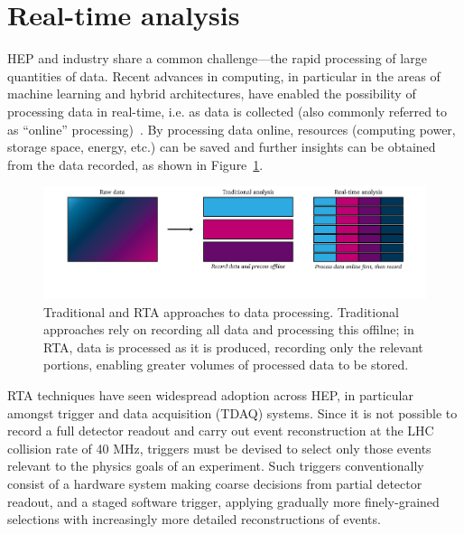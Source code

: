 \section{Real-time analysis}
\label{rta}
HEP and industry share a common challenge—the rapid processing of large quantities of data. \cite{hu-big-data} Recent advances in computing, in particular in the areas of machine learning and hybrid architectures, have enabled the possibility of processing data in real-time, i.e. as data is collected (also commonly referred to as ``online'' processing)~\cite{real-time-computing}. By processing data online, resources (computing power, storage space, energy, etc.) can be saved and further insights can be obtained from the data recorded, as shown in Figure~\ref{rta-diagram}. \par

\begin{figure}[h!]
    \centering
    \includegraphics[width=\linewidth]{figures/rta-diagram.pdf}
    \caption{Traditional and RTA approaches to data processing. Traditional approaches rely on recording all data and processing this offilne; in RTA, data is processed as it is produced, recording only the relevant portions, enabling greater volumes of processed data to be stored.}
    \label{rta-diagram}       %
\end{figure}

RTA techniques have seen widespread adoption across HEP, in particular amongst trigger and data acquisition (TDAQ) systems. Since it is not possible to record a full detector readout and carry out event reconstruction at the LHC collision rate of {40}{ MHz}, triggers must be devised to select only those events relevant to the physics goals of an experiment. Such triggers conventionally consist of a hardware system making coarse decisions from partial detector readout, and a staged software trigger, applying gradually more finely-grained selections with increasingly more detailed reconstructions of events.

